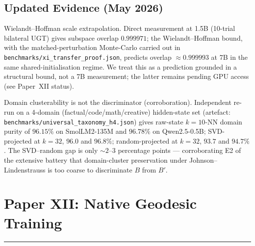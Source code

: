 \documentclass[11pt]{article}
\begin{document}
\subsection{Updated Evidence (May 2026)}
Wielandt--Hoffman scale extrapolation.
Direct measurement at 1.5B (10-trial bilateral UGT) gives subspace overlap
$0.999971$; the Wielandt--Hoffman bound, with the matched-perturbation
Monte-Carlo carried out in
\texttt{benchmarks/xi\_transfer\_proof.json}, predicts overlap
$\approx 0.999993$ at 7B in the same shared-initialisation regime.
We treat this as a prediction grounded in a structural bound,
not a 7B measurement; the latter remains pending GPU access
(see Paper~XII status).

Domain clusterability is not the discriminator (corroboration).
Independent re-run on a 4-domain (factual/code/math/creative) hidden-state
set (artefact: \texttt{benchmarks/universal\_taxonomy\_h4.json}) gives
raw-state $k{=}10$-NN domain purity of $96.15\%$ on SmolLM2-135M and
$96.78\%$ on Qwen2.5-0.5B; SVD-projected at $k{=}32$, $96.0$ and
$96.8\%$; random-projected at $k{=}32$, $93.7$ and $94.7\%$.  The
SVD--random gap is only $\sim 2$--$3$ percentage points --- corroborating
E2 of the extensive battery that domain-cluster preservation under
Johnson--Lindenstrauss is too coarse to discriminate $B$ from $B'$.

\newpage



\newpage
\section{Paper XII: Native Geodesic Training}
\vspace{6pt}
\hrule
\vspace{12pt}

\begin{abstract}
We introduce Native Geodesic Training, a method for training transformer components directly in a compressed $k$-dimensional manifold. The NativeLinear architecture replaces a standard weight matrix $W \in \mathbb{R}^{d \times d}$ with a learned core $C \in \mathbb{R}^{k \times k}$ and an orthonormal basis $B \in \mathbb{R}^{d \times k}$, where $k \ll d$. The effective weight is $W_{\mathrm{native}} = B C B^T$. At $k=128$ on a 1.5B model, this uses 9.1\% of standard parameters. Training uses RiemannianAdamW with QR retraction to keep $B$ on the Stiefel manifold. We demonstrate KExpansion (automatic $k$ growth when training plateaus), validate on attention weights at 135M and 1.5B scales (loss decreases monotonically with $k$ at both scales); 7B-scale validation is presently a Wielandt--Hoffman prediction from the bilateral 1.5B measurement (see Paper~XI Updated Evidence), not an end-to-end native-training run. The optimal $k^*$ is predicted analytically via the AttnRes phase transition: $k^* = \mathrm{L2\_MB} \times 42.7$ (the cross-vendor formula of Paper~IX; the single-vendor measurement in Paper~I anchors $48.0$ on Ada AD106 alone).
\end{abstract}
\end{document}
